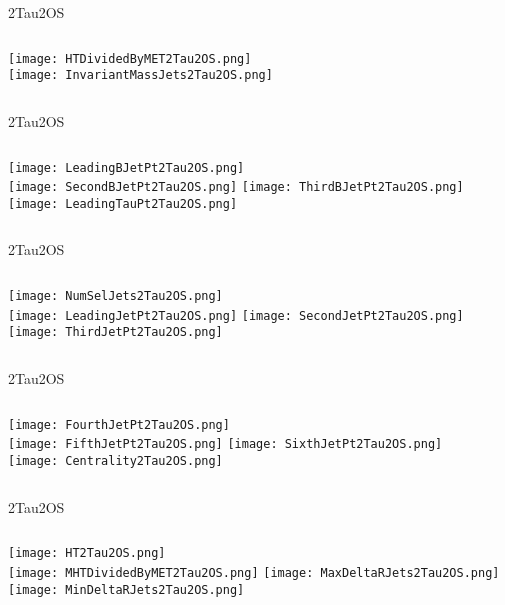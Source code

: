 \documentclass{beamer}
\begin{document}
\begin{frame}{2Tau2OS}
    \begin{columns}[t]
    \centering
    \texttt{[image: HTDividedByMET2Tau2OS.png]}\\
    \centering
    \texttt{[image: InvariantMassJets2Tau2OS.png]}
    \end{columns}
\end{frame}
\begin{frame}{2Tau2OS}
    \begin{columns}[t]
    \centering
    \texttt{[image: LeadingBJetPt2Tau2OS.png]}\\
    \texttt{[image: SecondBJetPt2Tau2OS.png]}
    \centering
    \texttt{[image: ThirdBJetPt2Tau2OS.png]}\\
    \texttt{[image: LeadingTauPt2Tau2OS.png]}
    \end{columns}
\end{frame}
\begin{frame}{2Tau2OS}
    \begin{columns}[t]
    \centering
    \texttt{[image: NumSelJets2Tau2OS.png]}\\
    \texttt{[image: LeadingJetPt2Tau2OS.png]}
    \centering
    \texttt{[image: SecondJetPt2Tau2OS.png]}\\
    \texttt{[image: ThirdJetPt2Tau2OS.png]}
    \end{columns}
\end{frame}
\begin{frame}{2Tau2OS}
    \begin{columns}[t]
    \centering
    \texttt{[image: FourthJetPt2Tau2OS.png]}\\
    \texttt{[image: FifthJetPt2Tau2OS.png]}
    \centering
    \texttt{[image: SixthJetPt2Tau2OS.png]}\\
    \texttt{[image: Centrality2Tau2OS.png]}
    \end{columns}
\end{frame}
\begin{frame}{2Tau2OS}
    \begin{columns}[t]
    \centering
    \texttt{[image: HT2Tau2OS.png]}\\
    \texttt{[image: MHTDividedByMET2Tau2OS.png]}
    \centering
    \texttt{[image: MaxDeltaRJets2Tau2OS.png]}\\
    \texttt{[image: MinDeltaRJets2Tau2OS.png]}
    \end{columns}
\end{frame}
\end{document}
